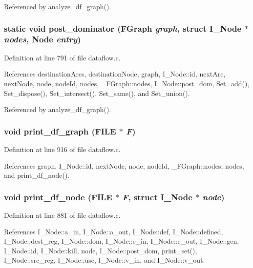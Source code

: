Referenced by analyze\_\-df\_\-graph().
\subsubsection{\setlength{\rightskip}{0pt plus 5cm}static void post\_\-dominator (\bf{FGraph} {\em graph}, struct \bf{I\_\-Node} $\ast$ {\em nodes}, \bf{Node} {\em entry})\hspace{0.3cm}{\tt  [static]}}\label{dataflow_8c_94c6077d3b61d20de24b30b3d3a019b4}




Definition at line 791 of file dataflow.c.

References destination\-Arcs, destination\-Node, graph, I\_\-Node::id, next\-Arc, next\-Node, node, node\-Id, nodes, \_\-FGraph::nodes, I\_\-Node::post\_\-dom, Set\_\-add(), Set\_\-dispose(), Set\_\-intersect(), Set\_\-same(), and Set\_\-union().

Referenced by analyze\_\-df\_\-graph().
\subsubsection{\setlength{\rightskip}{0pt plus 5cm}void print\_\-df\_\-graph (FILE $\ast$ {\em F})}\label{dataflow_8c_3f0a2441aab00712f252b61f1ca9b703}




Definition at line 916 of file dataflow.c.

References graph, I\_\-Node::id, next\-Node, node, node\-Id, \_\-FGraph::nodes, nodes, and print\_\-df\_\-node().
\subsubsection{\setlength{\rightskip}{0pt plus 5cm}void print\_\-df\_\-node (FILE $\ast$ {\em F}, struct \bf{I\_\-Node} $\ast$ {\em node})}\label{dataflow_8c_17dc8a7db94edf7cfdca834b178bde2f}




Definition at line 881 of file dataflow.c.

References I\_\-Node::a\_\-in, I\_\-Node::a\_\-out, I\_\-Node::def, I\_\-Node::defined, I\_\-Node::dest\_\-reg, I\_\-Node::dom, I\_\-Node::e\_\-in, I\_\-Node::e\_\-out, I\_\-Node::gen, I\_\-Node::id, I\_\-Node::kill, node, I\_\-Node::post\_\-dom, print\_\-set(), I\_\-Node::src\_\-reg, I\_\-Node::use, I\_\-Node::v\_\-in, and I\_\-Node::v\_\-out.

